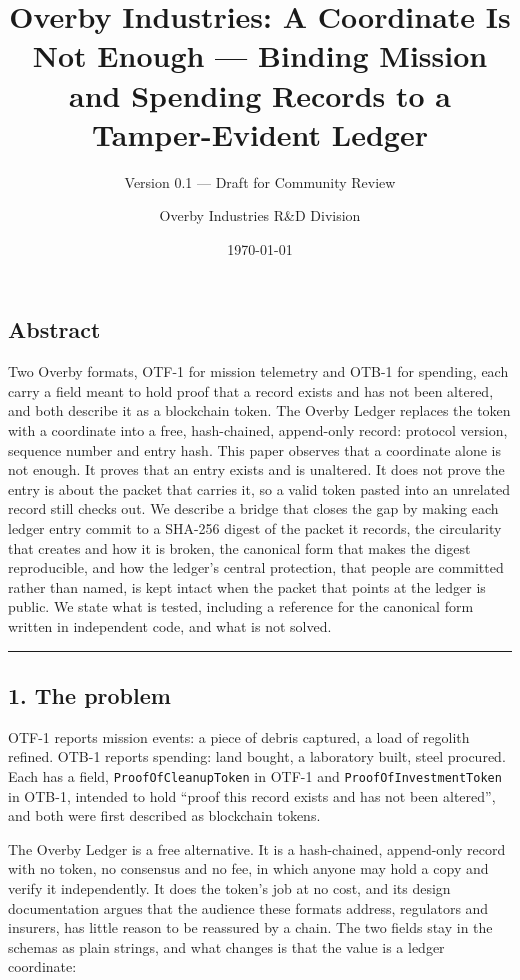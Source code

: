 \documentclass[
  12pt,
  letterpaper,
]{article}
\title{Overby Industries: A Coordinate Is Not Enough --- Binding Mission
and Spending Records to a Tamper-Evident Ledger}
\subtitle{Version 0.1 --- Draft for Community Review}
\author{Overby Industries R\&D Division}
\date{\today}
\begin{document}
\maketitle

{
\hypersetup{linkcolor=}
\setcounter{tocdepth}{2}
\tableofcontents
}
\hypertarget{abstract}{%
\subsection{Abstract}\label{abstract}}

Two Overby formats, OTF-1 for mission telemetry and OTB-1 for spending,
each carry a field meant to hold proof that a record exists and has not
been altered, and both describe it as a blockchain token. The Overby
Ledger replaces the token with a coordinate into a free, hash-chained,
append-only record: protocol version, sequence number and entry hash.
This paper observes that a coordinate alone is not enough. It proves
that an entry exists and is unaltered. It does not prove the entry is
about the packet that carries it, so a valid token pasted into an
unrelated record still checks out. We describe a bridge that closes the
gap by making each ledger entry commit to a SHA-256 digest of the packet
it records, the circularity that creates and how it is broken, the
canonical form that makes the digest reproducible, and how the ledger's
central protection, that people are committed rather than named, is kept
intact when the packet that points at the ledger is public. We state
what is tested, including a reference for the canonical form written in
independent code, and what is not solved.

\begin{center}\rule{0.5\linewidth}{0.5pt}\end{center}

\hypertarget{the-problem}{%
\subsection{1. The problem}\label{the-problem}}

OTF-1 reports mission events: a piece of debris captured, a load of
regolith refined. OTB-1 reports spending: land bought, a laboratory
built, steel procured. Each has a field, \texttt{ProofOfCleanupToken} in
OTF-1 and \texttt{ProofOfInvestmentToken} in OTB-1, intended to hold
``proof this record exists and has not been altered'', and both were
first described as blockchain tokens.

The Overby Ledger is a free alternative. It is a hash-chained,
append-only record with no token, no consensus and no fee, in which
anyone may hold a copy and verify it independently. It does the token's
job at no cost, and its design documentation argues that the audience
these formats address, regulators and insurers, has little reason to be
reassured by a chain. The two fields stay in the schemas as plain
strings, and what changes is that the value is a ledger coordinate:
\end{document}
